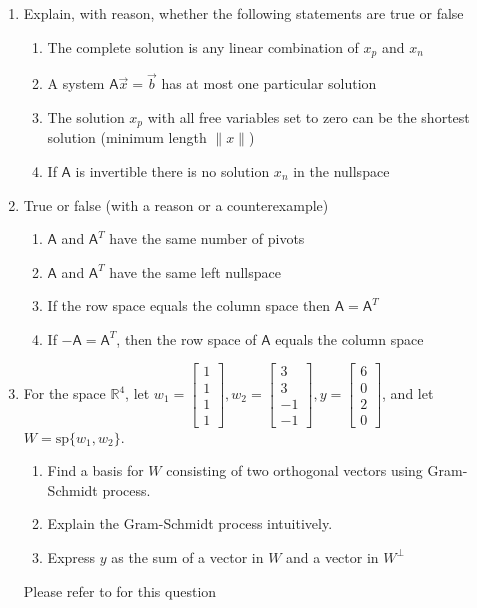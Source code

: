 \documentclass[a4paper, 11pt]{article}
\newcommand{\mat}[1]{\boldsymbol { \mathsf{#1}} }
\newcommand{\MYhref}[3][blue]{\href{#2}{\color{#1}{#3}}}
\begin{document}
\begin{enumerate}
\item Explain, with reason, whether the following statements are true or false
\begin{enumerate}[label=(\alph*)]
\item The complete solution is any linear combination of $x_p$ and $x_n$
\item A system $\mat A \vec x = \vec b$ has at most one particular solution
\item The solution $x_p$ with all free variables set to zero can be the shortest solution (minimum length $\|x\|$)
\item If $\mat A$ is invertible there is no solution $x_n$ in the nullspace
\end{enumerate}

\item True or false (with a reason or a counterexample)
\begin{enumerate}[label=(\alph*)]
\item $\mat A$ and $\mat A^T$ have the same number of pivots
\item $\mat A$ and $\mat A^T$ have the same left nullspace
\item If the row space equals the column space then $\mat A = \mat A^T$
\item If $-\mat A = \mat A^T$, then the row space of $\mat A$ equals the column space  
\end{enumerate}


\item For the space $\mathbb R^4$, let $w_1 = \begin{bmatrix} 1 \\ 1 \\ 1 \\ 1\end{bmatrix}, w_2 = \begin{bmatrix} 3 \\ 3 \\ -1 \\ -1\end{bmatrix}, y = \begin{bmatrix} 6 \\ 0 \\ 2 \\ 0\end{bmatrix}$, and let $W = \text{sp}\{w_1, w_2\}$. 

\begin{enumerate}[label=(\alph*)]
\item Find a basis for $W$ consisting of two orthogonal vectors using Gram-Schmidt process.
\item Explain the Gram-Schmidt process intuitively. 
\item Express $y$ as the sum of a vector in $W$ and a vector in $W^\perp$
\end{enumerate}

Please refer to \MYhref{https://textbooks.math.gatech.edu/ila/orthogonal-sets.html}{this link} for this question

\end{enumerate}
\end{document}
